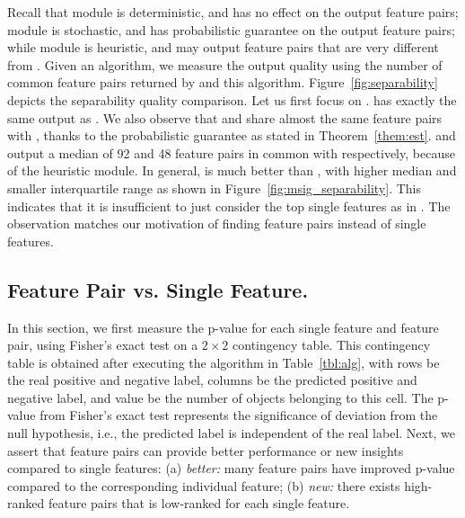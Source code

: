  Recall that \earlyT module is deterministic, and has no effect on the output \topk feature pairs; \sampling module is stochastic, and has probabilistic guarantee on the output \topk feature pairs; while \traversal module is heuristic, and may output \topk feature pairs that are very different from \baseline. Given an algorithm, we measure the output quality using the number of common feature pairs returned by \baseline and this algorithm. Figure~\ref{fig:separability} depicts the separability quality comparison. Let us first focus on \msig. \earlyOrder has exactly the same output as \baseline. We also observe that \samp and \sampOpt share almost the same \topk feature pairs with \baseline, thanks to the probabilistic guarantee as stated in Theorem~\ref{them:est}. \horiz and \vertic output a median of 92 and 48 feature pairs in common with \baseline respectively, because of the heuristic \traversal module. In general, \horiz is much better than \vertic, with higher median and smaller interquartile range as shown in Figure~\ref{fig:msig_separability}. This indicates that it is insufficient to just consider the top single features as in \vertic. The observation matches our motivation of finding feature pairs instead of single features.

\subsection{Feature Pair vs. Single Feature.}
In this section, we first measure the p-value for each \topk single feature and feature pair, using Fisher's exact test on a $2\times2$ contingency table. This contingency table is obtained after executing the algorithm in Table~\ref{tbl:alg}, with rows be the real positive and negative label, columns be the predicted positive and negative label, and value be the number of objects belonging to this cell. The p-value from Fisher's exact test represents the significance of deviation from the null hypothesis, i.e., the predicted label is independent of the real label. Next, we assert that feature pairs can provide better performance or new insights compared to single features: (a) {\em better:} many feature pairs have improved p-value compared to the corresponding individual feature; (b) {\em new:} there exists high-ranked feature pairs that is low-ranked for each single feature. 


